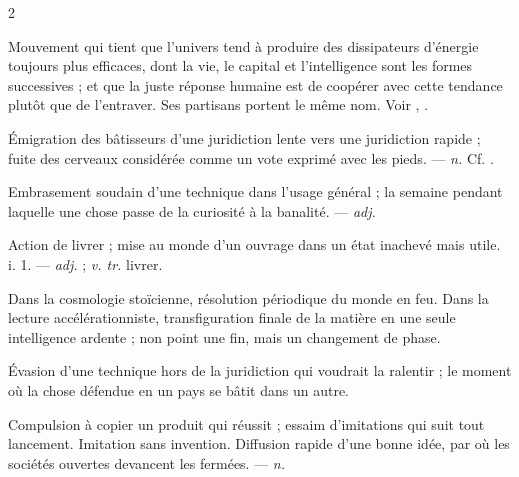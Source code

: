 \begin{multicols}{2}

 Mouvement qui tient que l'univers tend à produire des dissipateurs d'énergie toujours plus efficaces, dont la vie, le capital et l'intelligence sont les formes successives ; et que la juste réponse humaine est de coopérer avec cette tendance plutôt que de l'entraver. Ses partisans portent le même nom. Voir , .

 Émigration des bâtisseurs d'une juridiction lente vers une juridiction rapide ; fuite des cerveaux considérée comme un vote exprimé avec les pieds.   —  \textit{n.} Cf. .

  Embrasement soudain d'une technique dans l'usage général ; la semaine pendant laquelle une chose passe de la curiosité à la banalité.  —  \textit{adj.}

 Action de livrer ; mise au monde d'un ouvrage dans un état inachevé mais utile.   i. 1. —  \textit{adj.} ;  \textit{v. tr.} livrer.

  Dans la cosmologie stoïcienne, résolution périodique du monde en feu.   Dans la lecture accélérationniste, transfiguration finale de la matière en une seule intelligence ardente ; non point une fin, mais un changement de phase.

 Évasion d'une technique hors de la juridiction qui voudrait la ralentir ; le moment où la chose défendue en un pays se bâtit dans un autre. 

 Compulsion à copier un produit qui réussit ; essaim d'imitations qui suit tout lancement.   Imitation sans invention.   Diffusion rapide d'une bonne idée, par où les sociétés ouvertes devancent les fermées. —  \textit{n.}


\end{multicols}

